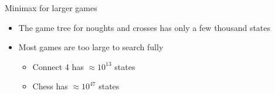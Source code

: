 \begin{frame}{Minimax for larger games}
	\begin{itemize}
		\pause\item The game tree for noughts and crosses has only a few thousand states
		\pause\item Most games are too large to search fully
			\begin{itemize}
				\pause\item Connect 4 has $\approx 10^{13}$ states
				\pause\item Chess has $\approx 10^{47}$ states
			\end{itemize}
	\end{itemize}
\end{frame}

